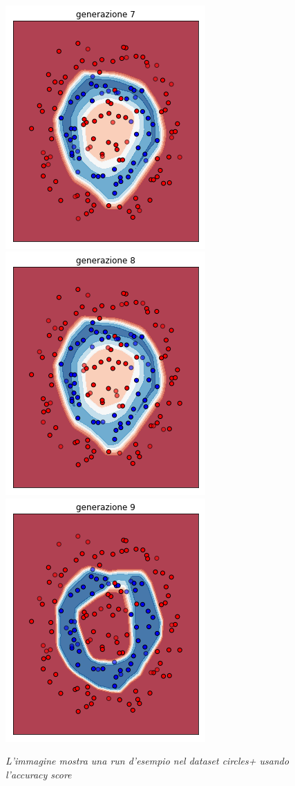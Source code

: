 \documentclass[12pt,a4paper]{report}
\begin{document}
\begin{figure}[H]
 \\
 \includegraphics[scale = 0.35]{images/circle+-rnd-acc./7}
 \includegraphics[scale = 0.35]{images/circle+-rnd-acc./8}
 \includegraphics[scale = 0.35]{images/circle+-rnd-acc./9}
 \caption{\textit{L'immagine mostra una run d'esempio nel dataset circles+ usando l'accuracy score}}
 \label{circles+1}
\end{figure}
\end{document}
